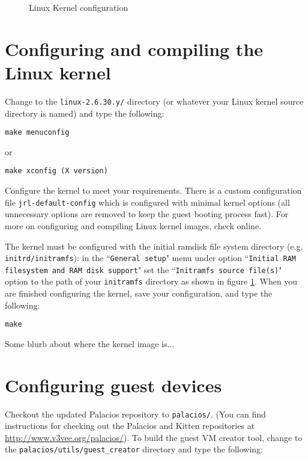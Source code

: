 \documentclass{article}[11pt]
\def\colfigsize{\epsfxsize=5in}
\begin{document}
\begin{figure}[ht]
  \begin{center}
    \colfigsize{}
  \end{center}
  \caption{Linux Kernel configuration}
  \label{fig:linuxcf}
\end{figure}


\section{Configuring and compiling the Linux kernel}

Change to the \verb|linux-2.6.30.y/| directory (or whatever your Linux kernel
source directory is named) and type the following:

\begin{verbatim}
make menuconfig
\end{verbatim}
or
\begin{verbatim}
make xconfig (X version)
\end{verbatim}

\vspace{10pt}
\noindent
Configure the kernel to meet your requirements. There is a custom configuration
file \verb|jrl-default-config| which is configured with minimal kernel options
(all unnecessary options are removed to keep the guest booting process fast).
For more on configuring and compiling Linux kernel images, check online.

\vspace{5pt}
\noindent
The kernel must be configured with the initial ramdisk file system directory
(e.g. \verb|initrd/initramfs|): in the ``\verb|General setup|" menu under
option
``\verb|Initial RAM filesystem and RAM disk support|" set the
``\verb|Initramfs source file(s)|" option to the path of your \verb|initramfs|
directory as shown in figure \ref{fig:linuxcf}. When you are finished
configuring the kernel, save your configuration, and type the following:
\begin{verbatim}
make
\end{verbatim}
Some blurb about where the kernel image is...


\section{Configuring guest devices}

Checkout the updated Palacios repository to \verb|palacios/|.  (You can find
instructions for checking out the Palacios and Kitten repositories at
\url{http://www.v3vee.org/palacios/}). To build the guest VM creator tool,
change to the \verb|palacios/utils/guest_creator| directory and type the
following:
\end{document}
